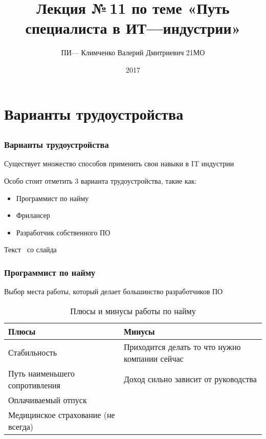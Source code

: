 \documentclass{../industrial-development}
\title{ Лекция №\,11 по теме «Путь специалиста в ИТ---индустрии»}
\author{ПИ--- Климченко Валерий Дмитриевич 21МО }
\date{2017 }
\begin{document}
\begin{frame}
  \titlepage
\end{frame}

\section{Варианты трудоустройства }

\subsection{}

\begin{frame} \frametitle{Варианты трудоустройства}
  \begin{block}{}
  Существует множество способов применить свои навыки в IT индустрии
  \end{block}

  \bigskip
Особо стоит отметить 3 варианта трудоустройства, такие как:
  
  \begin{itemize}
  \item Программист по найму
  \item Фрилансер
  \item Разработчик собственного ПО
  \end{itemize}
\end{frame}

\lecturenotes

Текст~\cite[с.~62--67]{Sonmez} со слайда

\begin{frame} \frametitle{Программист по найму}
  \begin{block}{}
    Выбор места работы, который делает большинство разработчиков ПО 
  \end{block}
  
\begin{table}[H]
\caption{\label{tab:canonsummary} Плюсы и минусы работы по найму}
\begin{center}
\begin{tabular}{|l|l|}
\hline
\textbf{Плюсы} & \textbf{Минусы} \\
\hline
Стабильность &  Приходится делать то что нужно компании сейчас \\
\hline
Путь наименьшего сопротивления  & Доход сильно зависит от руководства \\
\hline
Оплачиваемый отпуск & \\
\hline
Медицинское страхование (не всегда) & \\
\hline
\end{tabular}
\end{center}
\end{table} 

\end{frame}
\end{document}
